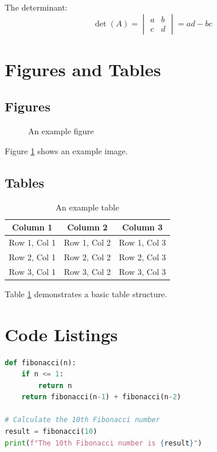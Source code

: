 \documentclass[12pt,a4paper]{article}
\begin{document}
The determinant:
\[
\det(A) = \begin{vmatrix}
a & b \\
c & d
\end{vmatrix} = ad - bc
\]

\section{Figures and Tables}

\subsection{Figures}

\begin{figure}[h]
\centering
\caption{An example figure}
\label{fig:example}
\end{figure}

Figure \ref{fig:example} shows an example image.

\subsection{Tables}

\begin{table}[h]
\centering
\begin{tabular}{|c|c|c|}
\hline
\textbf{Column 1} & \textbf{Column 2} & \textbf{Column 3} \\
\hline
Row 1, Col 1 & Row 1, Col 2 & Row 1, Col 3 \\
Row 2, Col 1 & Row 2, Col 2 & Row 2, Col 3 \\
Row 3, Col 1 & Row 3, Col 2 & Row 3, Col 3 \\
\hline
\end{tabular}
\caption{An example table}
\label{tab:example}
\end{table}

Table \ref{tab:example} demonstrates a basic table structure.

\section{Code Listings}

\begin{lstlisting}[language=Python]
def fibonacci(n):
    if n <= 1:
        return n
    return fibonacci(n-1) + fibonacci(n-2)

# Calculate the 10th Fibonacci number
result = fibonacci(10)
print(f"The 10th Fibonacci number is {result}")
\end{lstlisting}
\end{document}
